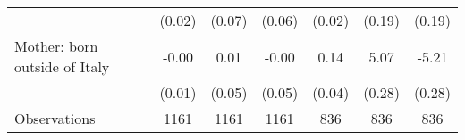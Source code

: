 {\begin{tabular}{l*{6}{c}}
                    &      (0.02)         &      (0.07)         &      (0.06)         &      (0.02)         &      (0.19)         &      (0.19)         \\
\addlinespace
Mother: born outside of Italy&       -0.00         &        0.01         &       -0.00         &        0.14\sym{***}&        5.07\sym{***}&       -5.21\sym{***}\\
                    &      (0.01)         &      (0.05)         &      (0.05)         &      (0.04)         &      (0.28)         &      (0.28)         \\
\midrule
Observations        &        1161         &        1161         &        1161         &         836         &         836         &         836         \\
\bottomrule
\end{tabular}
}
